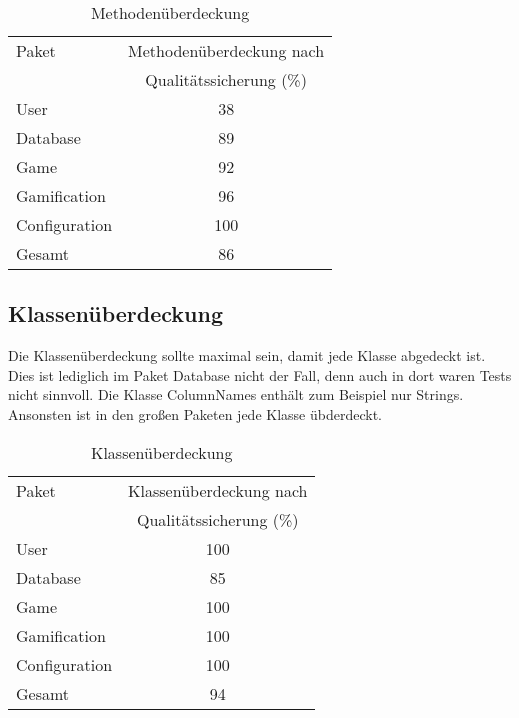 \documentclass[a4paper]{scrreprt}
\begin{document}
    \vspace{20pt}
    \begin{table}[h]
        \begin{center}
        \begin{tabular}{ | l | c | }
            \hline
            Paket & Methodenüberdeckung nach \\
            & Qualitätssicherung (\%) \\ \hline
            User & 38 \\
            Database & 89 \\
            Game & 92 \\
            Gamification & 96 \\
            Configuration & 100  \\
            Gesamt & 86  \\
            \hline
        \end{tabular}
        \end{center}
        \caption{Methodenüberdeckung}
    \end{table}%

    \newpage

    \subsection{Klassenüberdeckung}
    Die Klassenüberdeckung sollte maximal sein, damit jede Klasse abgedeckt ist. Dies ist lediglich im Paket Database nicht der Fall, denn
    auch in dort waren Tests nicht sinnvoll. Die Klasse ColumnNames enthält zum Beispiel nur Strings. Ansonsten ist in den großen Paketen jede Klasse übderdeckt.

    \vspace{20pt}
    \begin{table}[h]
        \begin{center}
        \begin{tabular}{ | l | c | }
            \hline
            Paket & Klassenüberdeckung nach \\
            & Qualitätssicherung (\%) \\ \hline
            User & 100 \\
            Database & 85 \\
            Game & 100 \\
            Gamification & 100 \\
            Configuration & 100  \\
            Gesamt & 94  \\
            \hline
        \end{tabular}
        \end{center}
        \caption{Klassenüberdeckung}
    \end{table}%
\end{document}
